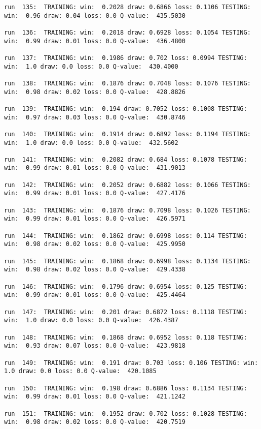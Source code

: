 \documentclass[11pt]{article}
\begin{document}
\begin{Verbatim}[commandchars=\\\{\}]
run  135:  TRAINING: win:  0.2028 draw: 0.6866 loss: 0.1106 TESTING: win:  0.96 draw: 0.04 loss: 0.0 Q-value:  435.5030

run  136:  TRAINING: win:  0.2018 draw: 0.6928 loss: 0.1054 TESTING: win:  0.99 draw: 0.01 loss: 0.0 Q-value:  436.4800

run  137:  TRAINING: win:  0.1986 draw: 0.702 loss: 0.0994 TESTING: win:  1.0 draw: 0.0 loss: 0.0 Q-value:  430.4000

run  138:  TRAINING: win:  0.1876 draw: 0.7048 loss: 0.1076 TESTING: win:  0.98 draw: 0.02 loss: 0.0 Q-value:  428.8826

run  139:  TRAINING: win:  0.194 draw: 0.7052 loss: 0.1008 TESTING: win:  0.97 draw: 0.03 loss: 0.0 Q-value:  430.8746

run  140:  TRAINING: win:  0.1914 draw: 0.6892 loss: 0.1194 TESTING: win:  1.0 draw: 0.0 loss: 0.0 Q-value:  432.5602

run  141:  TRAINING: win:  0.2082 draw: 0.684 loss: 0.1078 TESTING: win:  0.99 draw: 0.01 loss: 0.0 Q-value:  431.9013

run  142:  TRAINING: win:  0.2052 draw: 0.6882 loss: 0.1066 TESTING: win:  0.99 draw: 0.01 loss: 0.0 Q-value:  427.4176

run  143:  TRAINING: win:  0.1876 draw: 0.7098 loss: 0.1026 TESTING: win:  0.99 draw: 0.01 loss: 0.0 Q-value:  426.5971

run  144:  TRAINING: win:  0.1862 draw: 0.6998 loss: 0.114 TESTING: win:  0.98 draw: 0.02 loss: 0.0 Q-value:  425.9950

run  145:  TRAINING: win:  0.1868 draw: 0.6998 loss: 0.1134 TESTING: win:  0.98 draw: 0.02 loss: 0.0 Q-value:  429.4338

run  146:  TRAINING: win:  0.1796 draw: 0.6954 loss: 0.125 TESTING: win:  0.99 draw: 0.01 loss: 0.0 Q-value:  425.4464

run  147:  TRAINING: win:  0.201 draw: 0.6872 loss: 0.1118 TESTING: win:  1.0 draw: 0.0 loss: 0.0 Q-value:  426.4387

run  148:  TRAINING: win:  0.1868 draw: 0.6952 loss: 0.118 TESTING: win:  0.93 draw: 0.07 loss: 0.0 Q-value:  423.9818

run  149:  TRAINING: win:  0.191 draw: 0.703 loss: 0.106 TESTING: win:  1.0 draw: 0.0 loss: 0.0 Q-value:  420.1085

run  150:  TRAINING: win:  0.198 draw: 0.6886 loss: 0.1134 TESTING: win:  0.99 draw: 0.01 loss: 0.0 Q-value:  421.1242

run  151:  TRAINING: win:  0.1952 draw: 0.702 loss: 0.1028 TESTING: win:  0.98 draw: 0.02 loss: 0.0 Q-value:  420.7519


\end{Verbatim}
\end{document}
